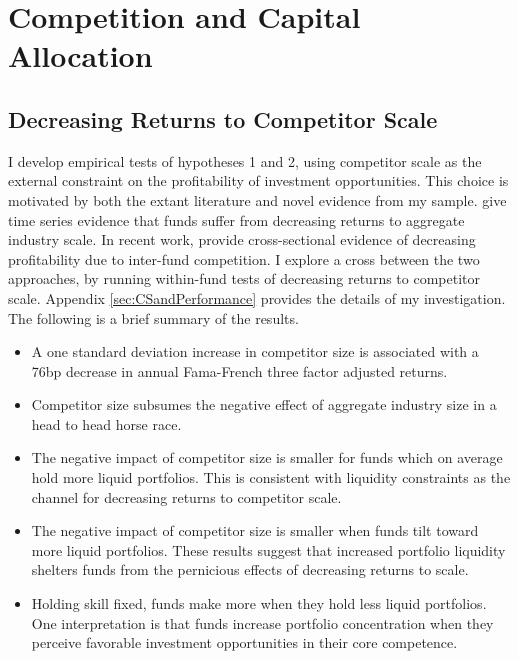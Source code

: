 \documentclass[openany]{book}
\providecommand{\tightlist}{%
  \setlength{\itemsep}{0pt}\setlength{\parskip}{0pt}}
\theoremstyle{definition}
\theoremstyle{definition}
\theoremstyle{definition}
\theoremstyle{remark}
\begin{document}
\chapter{Competition and Capital Allocation}\label{sec:portfolio}

\section{Decreasing Returns to Competitor
Scale}\label{decreasing-returns-to-competitor-scale}

I develop empirical tests of hypotheses 1 and 2, using competitor scale
as the external constraint on the profitability of investment
opportunities. This choice is motivated by both the extant literature
and novel evidence from my sample. \citet{pst15} give time series
evidence that funds suffer from decreasing returns to aggregate industry
scale. In recent work, \citet{hkp17} provide cross-sectional evidence of
decreasing profitability due to inter-fund competition. I explore a
cross between the two approaches, by running within-fund tests of
decreasing returns to competitor scale. Appendix
\ref{sec:CSandPerformance} provides the details of my investigation. The
following is a brief summary of the results.

\begin{itemize}
\tightlist
\item
  A one standard deviation increase in competitor size is associated
  with a 76bp decrease in annual Fama-French three factor adjusted
  returns.
\item
  Competitor size subsumes the negative effect of aggregate industry
  size in a head to head horse race.
\item
  The negative impact of competitor size is smaller for funds which on
  average hold more liquid portfolios. This is consistent with liquidity
  constraints as the channel for decreasing returns to competitor scale.
\item
  The negative impact of competitor size is smaller when funds tilt
  toward more liquid portfolios. These results suggest that increased
  portfolio liquidity shelters funds from the pernicious effects of
  decreasing returns to scale.
\item
  Holding skill fixed, funds make more when they hold less liquid
  portfolios. One interpretation is that funds increase portfolio
  concentration when they perceive favorable investment opportunities in
  their core competence.
\end{itemize}
\end{document}
